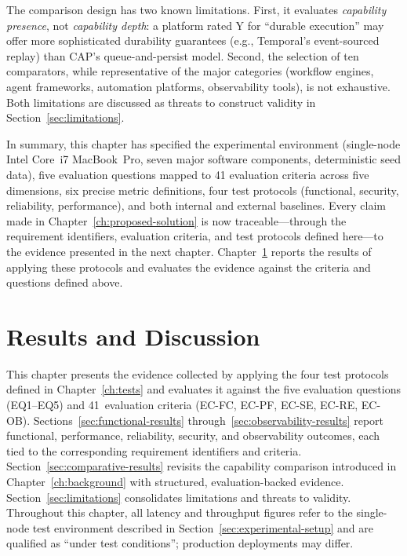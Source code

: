 \documentclass[a4paper]{sapthesis}
\begin{document}
The comparison design has two known limitations.  First, it evaluates
\emph{capability presence}, not \emph{capability depth}: a platform rated
Y for ``durable execution'' may offer more sophisticated durability
guarantees (e.g., Temporal's event-sourced replay) than CAP's
queue-and-persist model.  Second, the selection of ten comparators,
while representative of the major categories (workflow engines, agent
frameworks, automation platforms, observability tools), is not exhaustive.
Both limitations are discussed as threats to construct validity in
Section~\ref{sec:limitations}.

\medskip
\noindent
In summary, this chapter has specified the experimental environment
(single-node Intel Core~i7 MacBook~Pro, seven major software components, deterministic
seed data), five evaluation questions mapped to 41 evaluation criteria
across five dimensions, six precise metric definitions, four test
protocols (functional, security, reliability, performance), and both
internal and external baselines.  Every claim made in
Chapter~\ref{ch:proposed-solution} is now traceable---through the
requirement identifiers, evaluation criteria, and test protocols defined
here---to the evidence presented in the next chapter.
Chapter~\ref{ch:results} reports the results of applying these protocols
and evaluates the evidence against the criteria and questions defined
above.


\chapter{Results and Discussion}
\label{ch:results}

This chapter presents the evidence collected by applying the four test
protocols defined in Chapter~\ref{ch:tests} and evaluates it against the
five evaluation questions (EQ1--EQ5) and 41~evaluation criteria
(EC-FC, EC-PF, EC-SE, EC-RE, EC-OB).  Sections~\ref{sec:functional-results}
through~\ref{sec:observability-results} report functional, performance,
reliability, security, and observability outcomes, each tied to the
corresponding requirement identifiers and criteria.
Section~\ref{sec:comparative-results} revisits the capability comparison
introduced in Chapter~\ref{ch:background} with structured,
evaluation-backed evidence.
Section~\ref{sec:limitations} consolidates limitations and threats to
validity.  Throughout this chapter, all latency and throughput figures
refer to the single-node test environment described in
Section~\ref{sec:experimental-setup} and are qualified as ``under test
conditions''; production deployments may differ.
\end{document}
